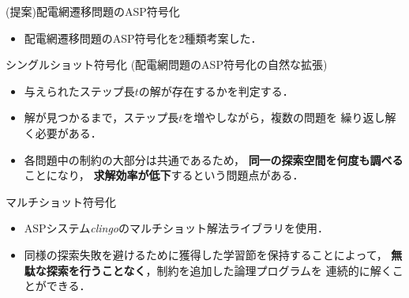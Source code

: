 \documentclass[dvipdfmx,11pt]{beamer}
\newcommand{\code}[1]{\lstinline[basicstyle=\ttfamily]{#1}}
\begin{document}
\begin{frame}{(提案)配電網遷移問題のASP符号化}
 \begin{itemize}
  \item 配電網遷移問題のASP符号化を2種類考案した．
 \end{itemize}
 \begin{block}{シングルショット符号化 (配電網問題のASP符号化の自然な拡張)}
    \begin{itemize}
    \item 与えられたステップ長$t$の解が存在するかを判定する．
    \item 解が見つかるまで，ステップ長$t$を増やしながら，複数の問題を
      繰り返し解く必要がある．
    \item 各問題中の制約の大部分は共通であるため，
      \textbf{同一の探索空間を何度も調べる}ことになり，
      \textbf{求解効率が低下}するという問題点がある．
  \end{itemize}
 \end{block}
 \vfill
 \begin{alertblock}{マルチショット符号化}
   \begin{itemize}
   \item ASPシステム\textit{clingo}のマルチショット解法ライブラリを使用．
   \item 同様の探索失敗を避けるために獲得した学習節を保持することによって，
		 \textbf{無駄な探索を行うことなく}，制約を追加した論理プログラムを
		 連続的に解くことができる．
  \end{itemize}
 \end{alertblock}
\end{frame}
\end{document}
